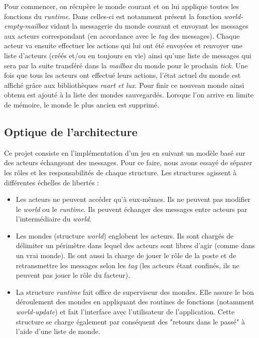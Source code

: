 \documentclass{article}
\begin{document}
Pour commencer, on récupère le monde courant et on lui applique toutes les fonctions du \textit{runtime}. Dans celles-ci est notamment présent la fonction \textit{world-empty-mailbox} vidant la messagerie du monde courant et envoyant les messages aux acteurs correspondant (en accordance avec le \textit{tag} des messages). Chaque acteur va ensuite effectuer les actions qui lui ont été envoyées et renvoyer une liste d'acteurs (créés et/ou en toujours en vie) ainsi qu'une liste de messages qui sera par la suite transféré dans la \textit{mailbox} du monde pour le prochain \textit{tick}. Une fois que tous les acteurs ont effectué leurs actions, l'état actuel du monde est affiché grâce aux bibliothèques \textit{raart et lux}. Pour finir ce nouveau monde ainsi obtenu est ajouté à la liste des mondes sauvegardés. Lorsque l'on arrive en limite de mémoire, le monde le plus ancien est supprimé. 

\subsection{Optique de l'architecture}

Ce projet consiste en l'implémentation d'un jeu en suivant un modèle basé sur des acteurs échangeant des messages. Pour ce faire, nous avons essayé de séparer les rôles et les responsabilités de chaque structure. Les structures agissent à différentes échelles de libertés :
\begin{itemize}
    \item Les acteurs ne peuvent accéder qu'à eux-mêmes. Ils ne peuvent pas modifier le \textit{world} ou le \textit{runtime}. Ils peuvent échanger des messages entre acteurs par l'intermédiaire du \textit{world}.
    \item Les mondes (structure \textit{world}) englobent les acteurs. Ils sont chargés de délimiter un périmètre dans lequel des acteurs sont libres d'agir (comme dans un vrai monde). Ils ont aussi la charge de jouer le rôle de la poste et de retransmettre les messages selon les \textit{tag} (les acteurs étant confinés, ils ne peuvent pas jouer le rôle du facteur).
    \item La structure \textit{runtime} fait office de superviseur des mondes. Elle assure le bon déroulement des mondes en appliquant des routines de fonctions (notamment \textit{world-update}) et fait l'interface avec l'utilisateur de l'application. Cette structure se charge également par conséquent des "retours dans le passé" à l'aide d'une liste de monde.
\end{itemize}
\end{document}
